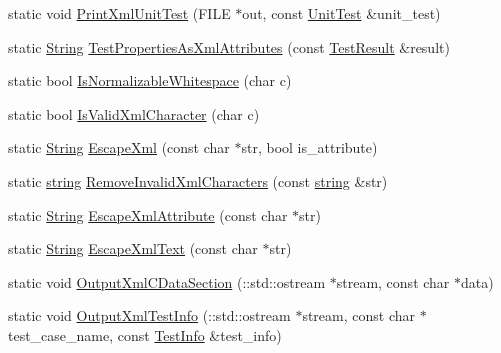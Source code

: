 \begin{DoxyCompactItemize}
\item 
static void \hyperlink{classtesting_1_1internal_1_1XmlUnitTestResultPrinter_aec193026deaa7c08c5dd5a1ef7366c19}{\-Print\-Xml\-Unit\-Test} (\-F\-I\-L\-E $\ast$out, const \hyperlink{classtesting_1_1UnitTest}{\-Unit\-Test} \&unit\-\_\-test)
\item 
static \hyperlink{classtesting_1_1internal_1_1String}{\-String} \hyperlink{classtesting_1_1internal_1_1XmlUnitTestResultPrinter_a7a77c4bf230869f9376a667fa768c294}{\-Test\-Properties\-As\-Xml\-Attributes} (const \hyperlink{classtesting_1_1TestResult}{\-Test\-Result} \&result)
\item 
static bool \hyperlink{classtesting_1_1internal_1_1XmlUnitTestResultPrinter_a3d910f5c6a752c629a276a8585640795}{\-Is\-Normalizable\-Whitespace} (char c)
\item 
static bool \hyperlink{classtesting_1_1internal_1_1XmlUnitTestResultPrinter_a18cfed6b1b9d7aedd2c43129c7e46e95}{\-Is\-Valid\-Xml\-Character} (char c)
\item 
static \hyperlink{classtesting_1_1internal_1_1String}{\-String} \hyperlink{classtesting_1_1internal_1_1XmlUnitTestResultPrinter_a98bbe277ee17bf44be89f01c9f60108b}{\-Escape\-Xml} (const char $\ast$str, bool is\-\_\-attribute)
\item 
static \hyperlink{namespacetesting_1_1internal_a9882e571372fc19a02d2b2949e1f1557}{string} \hyperlink{classtesting_1_1internal_1_1XmlUnitTestResultPrinter_ae4444a4820a2527e903703ec27e2d5aa}{\-Remove\-Invalid\-Xml\-Characters} (const \hyperlink{namespacetesting_1_1internal_a9882e571372fc19a02d2b2949e1f1557}{string} \&str)
\item 
static \hyperlink{classtesting_1_1internal_1_1String}{\-String} \hyperlink{classtesting_1_1internal_1_1XmlUnitTestResultPrinter_a96cf735f70894f043d9f39f02bff8535}{\-Escape\-Xml\-Attribute} (const char $\ast$str)
\item 
static \hyperlink{classtesting_1_1internal_1_1String}{\-String} \hyperlink{classtesting_1_1internal_1_1XmlUnitTestResultPrinter_a18cfca127592a1649ac9a536b7d3a2be}{\-Escape\-Xml\-Text} (const char $\ast$str)
\item 
static void \hyperlink{classtesting_1_1internal_1_1XmlUnitTestResultPrinter_aa2a41253c92af59cd20d8296d3c08219}{\-Output\-Xml\-C\-Data\-Section} (\-::std\-::ostream $\ast$stream, const char $\ast$data)
\item 
static void \hyperlink{classtesting_1_1internal_1_1XmlUnitTestResultPrinter_a91c2b652b231478b116eb11c05ca4091}{\-Output\-Xml\-Test\-Info} (\-::std\-::ostream $\ast$stream, const char $\ast$test\-\_\-case\-\_\-name, const \hyperlink{classtesting_1_1TestInfo}{\-Test\-Info} \&test\-\_\-info)

\end{DoxyCompactItemize}

